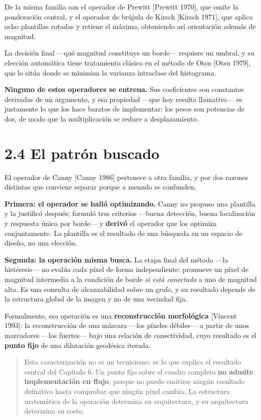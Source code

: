 De la misma familia son el operador de Prewitt {[}Prewitt 1970{]}, que
omite la ponderación central, y el operador de brújula de Kirsch
{[}Kirsch 1971{]}, que aplica ocho plantillas rotadas y retiene el
máximo, obteniendo así orientación además de magnitud.

La decisión final ---qué magnitud constituye un borde--- requiere un
umbral, y su elección automática tiene tratamiento clásico en el método
de Otsu {[}Otsu 1979{]}, que lo sitúa donde se minimiza la varianza
intraclase del histograma.

\textbf{Ninguno de estos operadores se entrena.} Sus coeficientes son
constantes derivadas de un argumento, y esa propiedad ---que hoy resulta
llamativa--- es justamente lo que los hace baratos de implementar: los
pesos son potencias de dos, de modo que la multiplicación se reduce a
desplazamiento.

\section{2.4 El patrón buscado}\label{el-patruxf3n-buscado}

El operador de Canny {[}Canny 1986{]} pertenece a otra familia, y por
dos razones distintas que conviene separar porque a menudo se confunden.

\textbf{Primera: el operador se halló optimizando.} Canny no propuso una
plantilla y la justificó después; formuló tres criterios ---buena
detección, buena localización y respuesta única por borde--- y
\textbf{derivó} el operador que los optimiza conjuntamente. La plantilla
es el resultado de una búsqueda en un espacio de diseño, no una
elección.

\textbf{Segunda: la operación misma busca.} La etapa final del método
---la histéresis--- no evalúa cada píxel de forma independiente:
promueve un píxel de magnitud intermedia a la condición de borde
\emph{si está conectado} a uno de magnitud alta. Es una consulta de
alcanzabilidad sobre un grafo, y su resultado depende de la estructura
global de la imagen y no de una vecindad fija.

Formalmente, esa operación es una \textbf{reconstrucción morfológica}
{[}Vincent 1993{]}: la reconstrucción de una máscara ---los píxeles
débiles--- a partir de unos marcadores ---los fuertes--- bajo una
relación de conectividad, cuyo resultado es el \textbf{punto fijo} de
una dilatación geodésica iterada.

\begin{quote}
Esta caracterización no es un tecnicismo: es lo que explica el resultado
central del Capítulo 6. Un punto fijo sobre el cuadro completo
\textbf{no admite implementación en flujo}, porque no puede emitirse
ningún resultado definitivo hasta comprobar que ningún píxel cambia. La
estructura matemática de la operación determina su arquitectura, y su
arquitectura determina su costo.
\end{quote}

